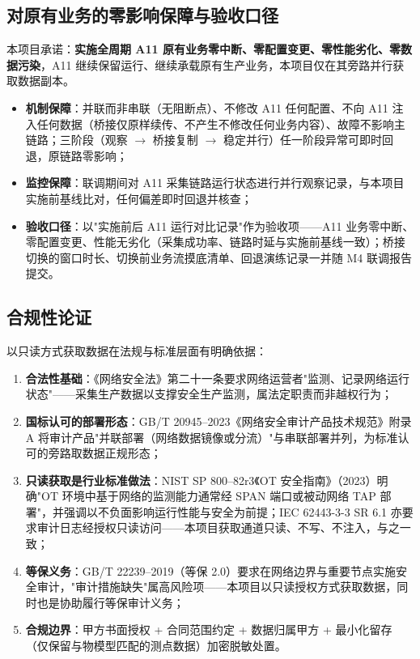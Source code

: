 \documentclass[11pt,a4paper]{ctexart}
\begin{document}
\subsection{对原有业务的零影响保障与验收口径}

本项目承诺：\textbf{实施全周期 A11 原有业务零中断、零配置变更、零性能劣化、零数据污染}，A11 继续保留运行、继续承载原有生产业务，本项目仅在其旁路并行获取数据副本。

\begin{itemize}[leftmargin=*]
  \item \textbf{机制保障}：并联而非串联（无阻断点）、不修改 A11 任何配置、不向 A11 注入任何数据（桥接仅原样续传、不产生不修改任何业务内容）、故障不影响主链路；三阶段（观察 $\rightarrow$ 桥接复制 $\rightarrow$ 稳定并行）任一阶段异常可即时回退，原链路零影响；
  \item \textbf{监控保障}：联调期间对 A11 采集链路运行状态进行并行观察记录，与本项目实施前基线比对，任何偏差即时回退并核查；
  \item \textbf{验收口径}：以"实施前后 A11 运行对比记录"作为验收项——A11 业务零中断、零配置变更、性能无劣化（采集成功率、链路时延与实施前基线一致）；桥接切换的窗口时长、切换前业务流摸底清单、回退演练记录一并随 M4 联调报告提交。
\end{itemize}

\subsection{合规性论证}

以只读方式获取数据在法规与标准层面有明确依据：

\begin{enumerate}[leftmargin=*]
  \item \textbf{合法性基础}：《网络安全法》第二十一条要求网络运营者"监测、记录网络运行状态"——采集生产数据以支撑安全生产监测，属法定职责而非越权行为；
  \item \textbf{国标认可的部署形态}：GB/T 20945--2023《网络安全审计产品技术规范》附录 A 将审计产品"并联部署（网络数据镜像或分流）"与串联部署并列，为标准认可的旁路取数据正规形态；
  \item \textbf{只读获取是行业标准做法}：NIST SP 800--82r3《OT 安全指南》（2023）明确"OT 环境中基于网络的监测能力通常经 SPAN 端口或被动网络 TAP 部署"，并强调以不负面影响运行性能与安全为前提；IEC 62443-3-3 SR 6.1 亦要求审计日志经授权只读访问——本项目获取通道只读、不写、不注入，与之一致；
  \item \textbf{等保义务}：GB/T 22239--2019（等保 2.0）要求在网络边界与重要节点实施安全审计，"审计措施缺失"属高风险项——本项目以只读授权方式获取数据，同时也是协助履行等保审计义务；
  \item \textbf{合规边界}：甲方书面授权 + 合同范围约定 + 数据归属甲方 + 最小化留存（仅保留与物模型匹配的测点数据）加密脱敏处置。
\end{enumerate}
\end{document}
